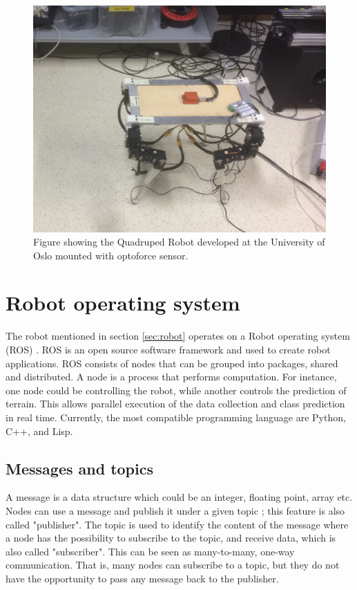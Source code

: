 \documentclass[USenglish]{ifimaster}  %
\begin{document}
\begin{figure}[h]
	\centering
	\includegraphics[width=\textwidth,height=\textheight,keepaspectratio]{Figures/Robot3}
	\caption{Figure showing the Quadruped Robot developed at the University of Oslo mounted with optoforce sensor.}
	\label{fig:robot}
\end{figure}
\FloatBarrier


\section{Robot operating system}
The robot mentioned in section \ref{sec:robot} operates on a Robot operating system (ROS) \cite{ROSintro}. ROS is an open source software framework and used to create robot applications. ROS consists of nodes that can be grouped into packages, shared and distributed. A node is a process that performs computation. For instance, one node could be controlling the robot, while another controls the prediction of terrain. This allows parallel execution of the data collection and class prediction in real time. Currently, the most compatible programming language are Python, C++, and Lisp.

\subsection{Messages and topics}
A message is a data structure which could be an integer, floating point, array etc. Nodes can use a message and publish it under a given topic \cite{ROSconcept}; this feature is also called "publisher". The topic is used to identify the content of the message where a node has the possibility to subscribe to the topic, and receive data, which is also called "subscriber". This can be seen as many-to-many, one-way communication. That is, many nodes can subscribe to a topic, but they do not have the opportunity to pass any message back to the publisher.
\end{document}
